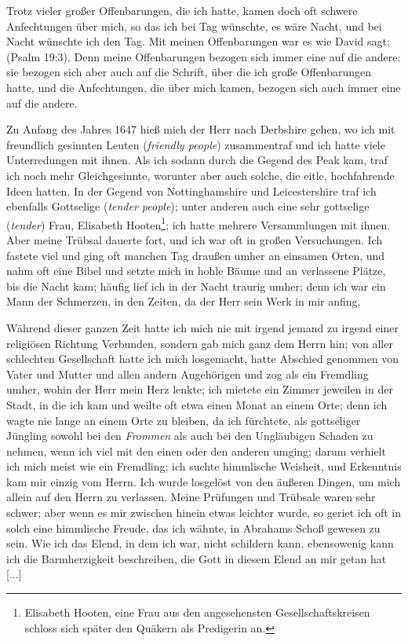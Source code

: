 Trotz vieler großer Offenbarungen, die ich hatte, kamen doch
oft schwere Anfechtungen über mich, 
so das ich bei Tag wünschte,
es wäre Nacht, und bei Nacht wünschte ich den Tag. Mit meinen
Offenbarungen war es wie David sagt:  
(Psalm 19:3).
Denn meine Offenbarungen bezogen sich immer eine auf die
andere: sie bezogen sich aber auch auf die Schrift, über die ich
große Offenbarungen hatte, und die Anfechtungen, die über mich
kamen, bezogen sich auch immer eine auf die andere.

Zu Anfang des Jahres 1647 hieß mich der Herr nach
Derbshire gehen, wo ich mit freundlich gesinnten Leuten 
(\textit{friendly people}) zusammentraf und ich hatte 
viele Unterredungen mit
ihnen. Als ich sodann durch die Gegend des Peak kam, traf
ich noch mehr Gleichgesinnte, worunter aber auch solche, die 
eitle, hochfahrende Ideen hatten. In der Gegend von 
Nottinghamshire
und Leicestershire traf ich ebenfalls Gottselige 
(\textit{tender people});
unter anderen auch eine sehr gottselige (\textit{tender}) 
Frau, Elisabeth Hooten\footnote{Elisabeth Hooten, eine Frau aus den angesehensten 
Gesellschaftskreisen schloss sich später den Quäkern als Predigerin an.}; 
ich hatte mehrere Versammlungen mit ihnen. Aber
meine Trübsal dauerte fort, und ich war oft in großen Versuchungen. 
Ich fastete viel und ging oft manchen Tag draußen
umher an einsamen Orten, und nahm oft eine Bibel und setzte
mich in hohle Bäume und an verlassene Plätze, 
bis die Nacht
kam; häufig lief ich in der Nacht traurig umher; denn ich war
ein Mann der Schmerzen, in den Zeiten, da der Herr sein Werk
in mir anfing.

Während dieser ganzen Zeit hatte ich mich nie mit irgend
jemand zu irgend einer religiösen Richtung Verbunden, sondern
gab mich ganz dem Herrn hin; von aller schlechten Gesellschaft
hatte ich mich losgemacht, hatte Abschied genommen von Vater
und Mutter und allen andern Angehörigen und zog als ein
Fremdling umher, wohin der Herr mein Herz lenkte; ich mietete
ein Zimmer jeweilen in der Stadt, in die ich kam und weilte oft
etwa einen Monat an einem Orte; denn ich wagte nie lange an
einem Orte zu bleiben, da ich fürchtete, als gottseliger Jüngling
sowohl bei den \textit{Frommen} als auch bei den Ungläubigen Schaden
zu nehmen, wenn ich viel mit den einen oder den anderen umging;
darum verhielt ich mich meist wie ein Fremdling; ich suchte himmlische 
Weisheit, und Erkenntnis kam mir einzig vom Herrn. Ich
wurde losgelöst von den äußeren Dingen, um mich allein auf
den Herrn zu verlassen. Meine Prüfungen und Trübsale waren
sehr schwer; aber wenn es mir zwischen hinein etwas leichter
wurde, so geriet ich oft in solch eine himmlische Freude, das ich
wähnte, in Abrahams Schoß gewesen zu sein. Wie ich das Elend,
in dem ich war, nicht schildern kann, ebensowenig kann ich die
Barmherzigkeit beschreiben, die Gott in diesem Elend an mir getan
hat [...]

